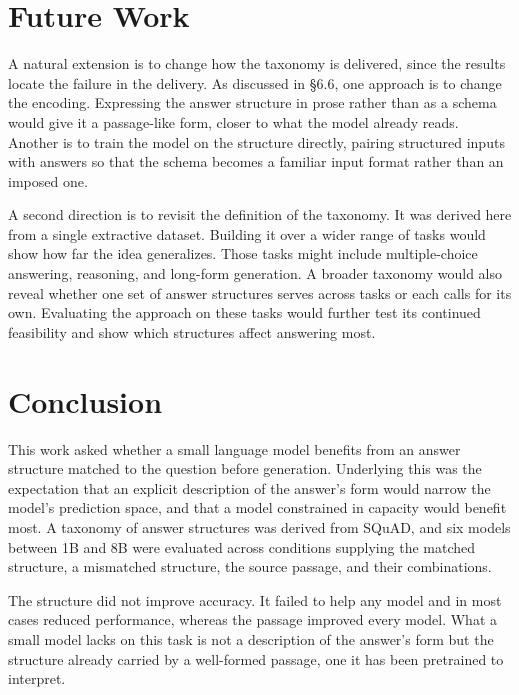 \documentclass{article}
\begin{document}
\section{Future Work}

A natural extension is to change how the taxonomy is delivered, since the results locate the failure in the delivery. As discussed in \S6.6, one approach is to change the encoding. Expressing the answer structure in prose rather than as a schema would give it a passage-like form, closer to what the model already reads. Another is to train the model on the structure directly, pairing structured inputs with answers so that the schema becomes a familiar input format rather than an imposed one.

A second direction is to revisit the definition of the taxonomy. It was derived here from a single extractive dataset. Building it over a wider range of tasks would show how far the idea generalizes. Those tasks might include multiple-choice answering, reasoning, and long-form generation. A broader taxonomy would also reveal whether one set of answer structures serves across tasks or each calls for its own. Evaluating the approach on these tasks would further test its continued feasibility and show which structures affect answering most.

\section{Conclusion}

This work asked whether a small language model benefits from an answer structure matched to the question before generation. Underlying this was the expectation that an explicit description of the answer's form would narrow the model's prediction space, and that a model constrained in capacity would benefit most. A taxonomy of answer structures was derived from SQuAD, and six models between 1B and 8B were evaluated across conditions supplying the matched structure, a mismatched structure, the source passage, and their combinations.

The structure did not improve accuracy. It failed to help any model and in most cases reduced performance, whereas the passage improved every model. What a small model lacks on this task is not a description of the answer's form but the structure already carried by a well-formed passage, one it has been pretrained to interpret.
\end{document}
